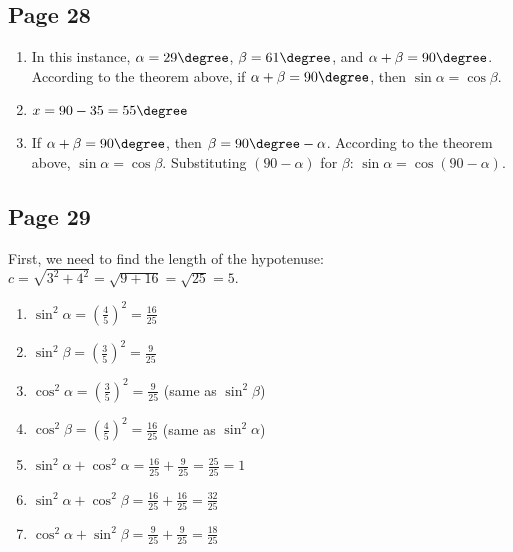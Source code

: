\documentclass{article}
\newenvironment{solutions}[1]
{\subsection*{#1}
 \begin{enumerate}[leftmargin=1.5em]}
{\end{enumerate}}
\newenvironment{solutionswithpreamble}[2]
{\subsection*{#1}
 #2
 \begin{enumerate}[leftmargin=1.5em]}
{\end{enumerate}}
\newcommand{\solution}{\item}
\begin{document}
\begin{solutions}{Page 28}
\solution %
In this instance, $\alpha=29\degree$, $\beta=61\degree$, and $\alpha + \beta = 90\degree$. According to the theorem above, if $\alpha + \beta = 90\degree$, then $\sin{\alpha} = \cos{\beta}$.

\solution %
$x = 90 - 35 = 55\degree$

\solution %
If $\alpha + \beta = 90\degree$, then $\beta =  90\degree - \alpha$.
According to the theorem above, $\sin{\alpha} = \cos{\beta}$.
Substituting $(90- \alpha)$ for $\beta$: $\sin{\alpha} = \cos{(90 - \alpha)}$.
\end{solutions}

\begin{solutionswithpreamble}{Page 29}
{First, we need to find the length of the hypotenuse: $c = \sqrt{3^2 + 4^2} = \sqrt{9 + 16} = \sqrt{25} = 5.$}
\solution $\sin^{2}{\alpha} = \left(\frac{4}{5}\right)^2 = \frac{16}{25}$
\solution $\sin^{2}{\beta} = \left(\frac{3}{5}\right)^2 = \frac{9}{25}$
\solution $\cos^{2}{\alpha} = \left(\frac{3}{5}\right)^2 = \frac{9}{25}$ (same as $\sin^{2}{\beta}$)
\solution $\cos^{2}{\beta} = \left(\frac{4}{5}\right)^2 = \frac{16}{25}$ (same as $\sin^{2}{\alpha}$)
\solution $\sin^{2}{\alpha} + \cos^{2}{\alpha} = \frac{16}{25} + \frac{9}{25} = \frac{25}{25} = 1$
\solution $\sin^{2}{\alpha} + \cos^{2}{\beta} = \frac{16}{25} + \frac{16}{25} = \frac{32}{25}$
\solution $\cos^{2}{\alpha} + \sin^{2}{\beta} = \frac{9}{25} + \frac{9}{25} = \frac{18}{25}$
\end{solutionswithpreamble}
\end{document}
